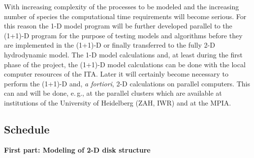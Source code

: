 With increasing complexity of the processes to be modeled and the
increasing number of species the computational time requirements
will become serious. For this reason the 1-D model program will be
further developed parallel to the (1+1)-D program for the purpose
of testing models and algorithms before they are implemented in
the (1+1)-D or finally transferred to the fully 2-D hydrodynamic
model. The 1-D model calculations and, at least during the first
phase of the project, the (1+1)-D model calculations can be done
with the local computer resources of the ITA. Later it will
certainly become necessary to perform the (1+1)-D and, \emph{a
fortiori}, 2-D calculations on parallel computers. This can and
will be done, e.\,g., at the parallel clusters which are available
at institutions of the University of Heidelberg (ZAH, IWR) and at
the MPIA.

\medskip
\subsection{Schedule}

\medskip\noindent%
\textbf{First part: Modeling of 2-D disk structure}

